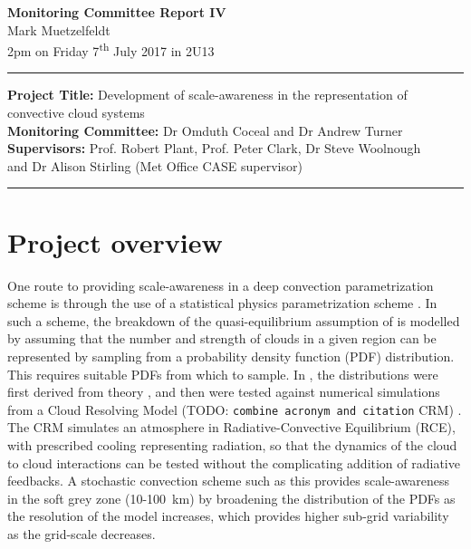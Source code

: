 \documentclass[11pt,a4paper]{article}
\newcommand{\ts}{\textsuperscript}
\newcommand{\todo}{TODO: \texttt}
\begin{document}

\begin{center}
    \Large{\textbf{Monitoring Committee Report IV}}\\[0.1cm]
    \large{Mark Muetzelfeldt}\\
    \normalsize{2pm on Friday 7\ts{th} July 2017 in 2U13}\\[0.1cm]		
    \rule{\textwidth}{0.2mm}
    \textbf{Project Title: }Development of scale-awareness in the representation of
    convective cloud systems\\
    \textbf{Monitoring Committee: }Dr Omduth Coceal and  Dr Andrew Turner\\
    \textbf{Supervisors: }Prof. Robert Plant, Prof. Peter Clark, Dr Steve Woolnough \\
    and Dr Alison Stirling (Met Office CASE supervisor)\\
    \rule{\textwidth}{0.2mm}
\end{center}

\section{Project overview}
\label{sec:Project Overview}

One route to providing scale-awareness in a deep convection parametrization scheme is through the use of a statistical physics parametrization scheme \parencite{plant2008stochastic}. In such a scheme, the breakdown of the quasi-equilibrium assumption of \cite{arakawa1974interaction} is modelled by assuming that the number and strength of clouds in a given region can be represented by sampling from a probability density function (PDF) distribution. This requires suitable PDFs from which to sample. In \cite{plant2008stochastic}, the distributions were first derived from theory \parencite{craig2006fluctuations}, and then were tested against numerical simulations from a Cloud Resolving Model (\todo{combine acronym and citation} CRM) \parencite{cohen2006fluctuations}. The CRM simulates an atmosphere in Radiative-Convective Equilibrium (RCE), with prescribed cooling representing radiation, so that the dynamics of the cloud to cloud interactions can be tested without the complicating addition of radiative feedbacks. A stochastic convection scheme such as this provides scale-awareness in the soft grey zone (\SI{10}{}-\SI{100}{km}) by broadening the distribution of the PDFs as the resolution of the model increases, which provides higher sub-grid variability as the grid-scale decreases.
\end{document}
